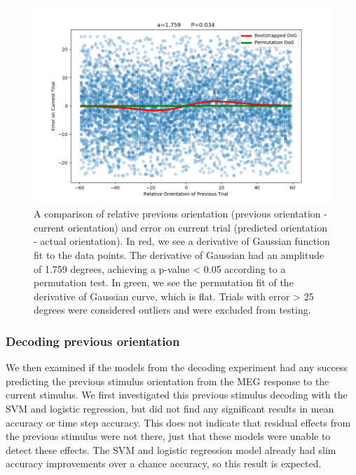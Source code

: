 \documentclass[../main.tex]{subfiles}
\begin{document}
\begin{figure}
    \centering
    \includegraphics[scale=0.7]{figures/results/DoG_plot.png}
    \caption{A comparison of relative previous orientation (previous orientation - current orientation) and error on current trial (predicted orientation - actual orientation). In red, we see a derivative of Gaussian function fit to the data points. The derivative of Gaussian had an amplitude of 1.759 degrees, achieving a p-value < 0.05 according to a permutation test. In green, we see the permutation fit of the derivative of Gaussian curve, which is flat. Trials with error > 25 degrees were considered outliers and were excluded from testing. }
    \label{DoG}
\end{figure}

\subsubsection{Decoding previous orientation}
We then examined if the models from the decoding experiment had any success predicting the previous stimulus orientation from the MEG response to the current stimulus. We first investigated this previous stimulus decoding with the SVM and logistic regression, but did not find any significant results in mean accuracy or time step accuracy. This does not indicate that residual effects from the previous stimulus were not there, just that these models were unable to detect these effects. The SVM and logistic regression model already had slim accuracy improvements over a chance accuracy, so this result is expected.
\end{document}
